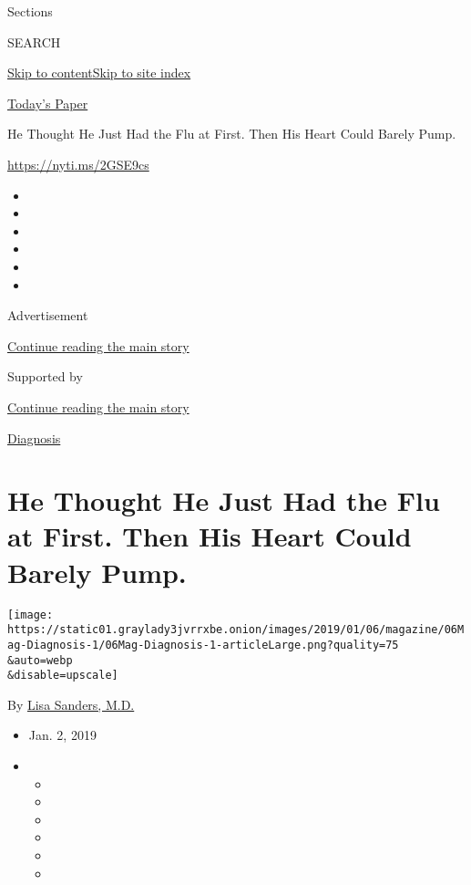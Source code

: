 Sections

SEARCH

\protect\hyperlink{site-content}{Skip to
content}\protect\hyperlink{site-index}{Skip to site index}

\href{https://myaccount.nytimes3xbfgragh.onion/auth/login?response_type=cookie\&client_id=vi}{}

\href{https://www.nytimes3xbfgragh.onion/section/todayspaper}{Today's
Paper}

He Thought He Just Had the Flu at First. Then His Heart Could Barely
Pump.

\url{https://nyti.ms/2GSE9cs}

\begin{itemize}
\item
\item
\item
\item
\item
\item
\end{itemize}

Advertisement

\protect\hyperlink{after-top}{Continue reading the main story}

Supported by

\protect\hyperlink{after-sponsor}{Continue reading the main story}

\href{/column/diagnosis}{Diagnosis}

\hypertarget{he-thought-he-just-had-the-flu-at-first-then-his-heart-could-barely-pump}{%
\section{He Thought He Just Had the Flu at First. Then His Heart Could
Barely
Pump.}\label{he-thought-he-just-had-the-flu-at-first-then-his-heart-could-barely-pump}}

\texttt{[image: https://static01.graylady3jvrrxbe.onion/images/2019/01/06/magazine/06Mag-Diagnosis-1/06Mag-Diagnosis-1-articleLarge.png?quality=75\\\&auto=webp\\\&disable=upscale]}

By \href{https://www.nytimes3xbfgragh.onion/by/lisa-sanders-md}{Lisa
Sanders, M.D.}

\begin{itemize}
\item
  Jan. 2, 2019
\item
  \begin{itemize}
  \item
  \item
  \item
  \item
  \item
  \item
  \end{itemize}
\end{itemize}

